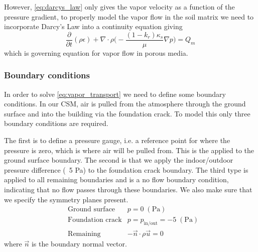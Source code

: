 However, \eqref{eq:darcys_law} only gives the vapor velocity as a function of the pressure gradient, to properly model the vapor flow in the soil matrix we need to incorporate Darcy's Law into a continuity equation giving
\begin{equation}\label{eq:vapor_transport}
  \frac{\partial}{\partial t} (\rho \epsilon) + \nabla \cdot \rho \Big( -\frac{(1-k_r) \kappa_s}{\mu} \nabla p \Big) = Q_m
\end{equation}
which is governing equation for vapor flow in porous media.\par

\subsubsection{Boundary conditions}

In order to solve \eqref{eq:vapor_transport} we need to define some boundary conditions.
In our CSM, air is pulled from the atmosphere through the ground surface and into the building via the foundation crack.
To model this only three boundary conditions are required.\par

The first is to define a pressure gauge, i.e. a reference point for where the pressure is zero, which is where air will be pulled from.
This is the applied to the ground surface boundary.
The second is that we apply the indoor/outdoor pressure difference (~5 Pa) to the foundation crack boundary.
The third type is applied to all remaining boundaries and is a no flow boundary condition, indicating that no flow passes through these boundaries.
We also make sure that we specify the symmetry planes present.
\begin{align}
  &\text{Ground surface} &p = 0 \; \mathrm{(Pa)} \\
  &\text{Foundation crack} &p = p_\mathrm{in/out} = -5 \; \mathrm{(Pa)} \\
  &\text{Remaining} &-\vec{n}\cdot\rho\vec{u} = 0
\end{align}
where $\vec{n}$ is the boundary normal vector.\par
